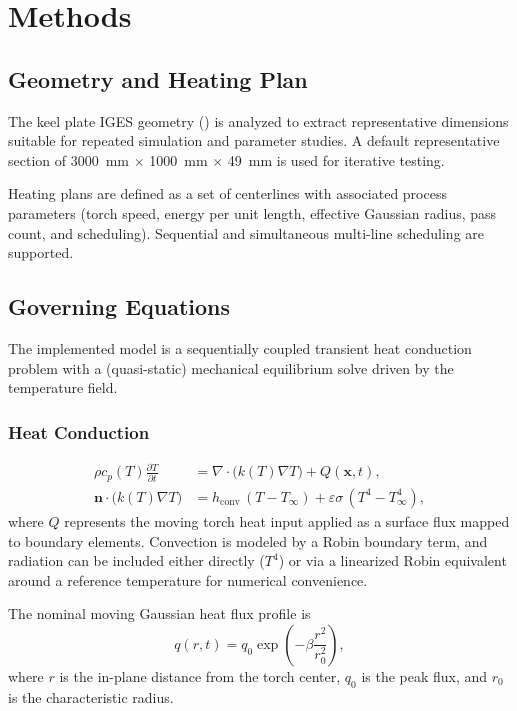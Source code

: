 \documentclass[11pt,a4paper]{article}
\newcommand{\repoPath}[1]{\texttt{\detokenize{#1}}}
\begin{document}
\section{Methods}
\subsection{Geometry and Heating Plan}
The keel plate IGES geometry (\repoPath{IGESFiles/keel plate 0-5.igs}) is analyzed to extract representative dimensions suitable for repeated simulation and parameter studies. A default representative section of \SI{3000}{mm} \(\times\) \SI{1000}{mm} \(\times\) \SI{49}{mm} is used for iterative testing.

Heating plans are defined as a set of centerlines with associated process parameters (torch speed, energy per unit length, effective Gaussian radius, pass count, and scheduling). Sequential and simultaneous multi-line scheduling are supported.

\subsection{Governing Equations}
The implemented model is a sequentially coupled transient heat conduction problem with a (quasi-static) mechanical equilibrium solve driven by the temperature field.

\subsubsection{Heat Conduction}
\begin{align}
\rho c_p(T) \frac{\partial T}{\partial t} &= \nabla \cdot \bigl(k(T) \nabla T\bigr) + Q(\mathbf{x},t), \\
\mathbf{n}\cdot \bigl(k(T)\nabla T\bigr) &= h_{\mathrm{conv}}\,(T - T_{\infty}) + \varepsilon\sigma\,(T^4 - T_{\infty}^4),
\end{align}
where $Q$ represents the moving torch heat input applied as a surface flux mapped to boundary elements. Convection is modeled by a Robin boundary term, and radiation can be included either directly ($T^4$) or via a linearized Robin equivalent around a reference temperature for numerical convenience.

The nominal moving Gaussian heat flux profile is
\begin{equation}
q(r,t) = q_0 \exp\left(-\beta \frac{r^2}{r_0^2}\right),
\end{equation}
where $r$ is the in-plane distance from the torch center, $q_0$ is the peak flux, and $r_0$ is the characteristic radius.
\end{document}
